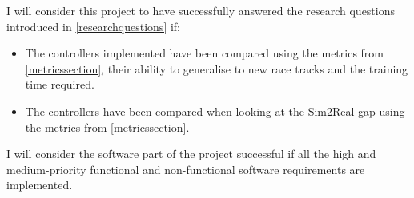 I will consider this project to have successfully answered the research questions introduced in \ref{researchquestions} if:
\begin{itemize}
	\item The controllers implemented have been compared using the metrics from \ref{metricssection}, their ability to generalise to new race tracks and the training time required.
	\item The controllers have been compared when looking at the Sim2Real gap using the metrics from \ref{metricssection}.
\end{itemize}

I will consider the software part of the project successful if all the high and medium-priority functional and non-functional software requirements are implemented.

